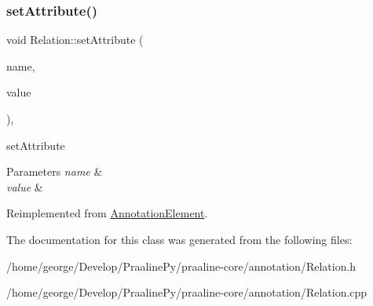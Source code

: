 \mbox{\label{class_relation_ae669645f5fc531a6118d68b51a4d64df}} 
\subsubsection{\texorpdfstring{set\+Attribute()}{setAttribute()}}
{\footnotesize\ttfamily void Relation\+::set\+Attribute (\begin{DoxyParamCaption}\item[{const Q\+String \&}]{name,  }\item[{Q\+Variant}]{value }\end{DoxyParamCaption})\hspace{0.3cm}{\ttfamily [override]}, {\ttfamily [virtual]}}



set\+Attribute 


\begin{DoxyParams}{Parameters}
{\em name} & \\
\hline
{\em value} & \\
\hline
\end{DoxyParams}


Reimplemented from \hyperlink{class_annotation_element_a206d8790fe92a7c8e6b703d026836584}{Annotation\+Element}.



The documentation for this class was generated from the following files\+:\begin{DoxyCompactItemize}
\item 
/home/george/\+Develop/\+Praaline\+Py/praaline-\/core/annotation/Relation.\+h\item 
/home/george/\+Develop/\+Praaline\+Py/praaline-\/core/annotation/Relation.\+cpp\end{DoxyCompactItemize}
